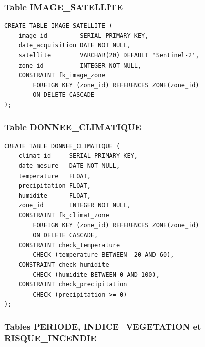 \documentclass[12pt,a4paper]{report}
\begin{document}
\subsubsection{Table IMAGE\_SATELLITE}

\begin{verbatim}
CREATE TABLE IMAGE_SATELLITE (
    image_id         SERIAL PRIMARY KEY,
    date_acquisition DATE NOT NULL,
    satellite        VARCHAR(20) DEFAULT 'Sentinel-2',
    zone_id          INTEGER NOT NULL,
    CONSTRAINT fk_image_zone
        FOREIGN KEY (zone_id) REFERENCES ZONE(zone_id)
        ON DELETE CASCADE
);
\end{verbatim}

\subsubsection{Table DONNEE\_CLIMATIQUE}

\begin{verbatim}
CREATE TABLE DONNEE_CLIMATIQUE (
    climat_id     SERIAL PRIMARY KEY,
    date_mesure   DATE NOT NULL,
    temperature   FLOAT,
    precipitation FLOAT,
    humidite      FLOAT,
    zone_id       INTEGER NOT NULL,
    CONSTRAINT fk_climat_zone
        FOREIGN KEY (zone_id) REFERENCES ZONE(zone_id)
        ON DELETE CASCADE,
    CONSTRAINT check_temperature
        CHECK (temperature BETWEEN -20 AND 60),
    CONSTRAINT check_humidite
        CHECK (humidite BETWEEN 0 AND 100),
    CONSTRAINT check_precipitation
        CHECK (precipitation >= 0)
);
\end{verbatim}

\subsubsection{Tables PERIODE, INDICE\_VEGETATION et RISQUE\_INCENDIE}
\end{document}
